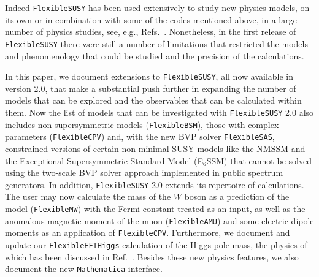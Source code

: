 \documentclass[final,3p,11pt,pdflatex]{elsarticle}
\makeatletter
\newcommand{\fs}{\texttt{FlexibleSUSY}\@\xspace}
\newcommand{\fstwo}{\fs 2.0\@\xspace}
\newcommand{\fbsm}{\texttt{FlexibleBSM}\@\xspace}
\newcommand{\fcpv}{\texttt{FlexibleCPV}\@\xspace}
\newcommand{\fmw}{\texttt{FlexibleMW}\@\xspace}
\newcommand{\famu}{\texttt{FlexibleAMU}\@\xspace}
\newcommand{\fsas}{\texttt{FlexibleSAS}\@\xspace}
\newcommand{\feft}{\texttt{Flex\-ib\-le\-EFT\-Higgs}\@\xspace}
\newcommand{\mathematica}{\texttt{Ma\-the\-ma\-ti\-ca}\xspace}
\newcommand{\ESSM}{E$_6$SSM\@\xspace}
\makeatother
\begin{document}
Indeed \fs has been used extensively to study new physics models, on
its own or in combination with some of the codes mentioned above, in a
large number of physics studies, see, e.g.,
Refs.\ \cite{Diessner:2014ksa,
  Athron:2014pua,Athron:2015tsa,Diessner:2015yna,Staub:2015aea,Athron:2015vxg,
  Diessner:2015iln,Bagnaschi:2015pwa,Staub:2016dxq,Athron:2016fuq,
  deFlorian:2016spz,Athron:2016gor,Athron:2016qqb,Drechsel:2016htw,
  Bagnaschi:2017xid,Athron:2017yua,Athron:2017kgt,Athron:2017qdc,
  Workgroup:2017bkh,Chakravarty:2017hcy,Harlander:2017kuc,Ellis:2017hdw}.
Nonetheless, in the first release of \fs there were still a number of
limitations that restricted the models and phenomenology that could be studied
and the precision of the calculations.

In this paper, we document extensions to \fs, all now available in
version 2.0, that make a substantial push further in expanding the
number of models that can be explored and the observables that can be
calculated within them.
Now the list of models that can be investigated with
\fstwo also includes non-supersymmetric models (\fbsm), those with
complex parameters (\fcpv) and, with the new BVP solver
\fsas, constrained versions of certain non-minimal SUSY models like the NMSSM
\cite{Ellwanger:2009dp, Maniatis:2009re,Ellwanger:1993xa,Elliott:1994ht,
  King:1995vk,Ellwanger:1995ru,Ellwanger:1996gw} and the Exceptional
Supersymmetric Standard Model (\ESSM)
\cite{King:2005jy,King:2005my,Athron:2010zz, Athron:2009ue,Athron:2009bs} that
cannot be solved using the two-scale BVP solver
\cite{Barger:1993gh} approach implemented in public spectrum
generators.
%
In addition, \fstwo extends its repertoire of calculations.
The user may now calculate the mass of the $W$ boson as a
prediction of the model (\fmw) with the Fermi
constant treated as an input, as well as the anomalous magnetic
moment of the muon (\famu) and some electric dipole moments as
an application of \fcpv. Furthermore, we document and update our \feft
calculation of the Higgs pole mass, the physics of which has been discussed
in Ref.~\cite{Athron:2016fuq}.  Besides these new physics features, we
also document the new \mathematica interface.
\end{document}
